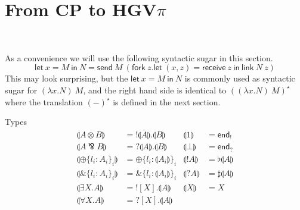 \documentclass{easychair}
\newcommand{\key}{\mathsf}
\newcommand{\set}[1]{\{ #1 \}}
\newcommand{\cptogv}[1]{\llparenthesis{#1}\rrparenthesis}
\newcommand{\row}[2]{\set{#1}_{#2}}
\newcommand{\gvOutput}[2]{\mathord{!}{#1}.{#2}}
\newcommand{\gvInput}[2]{\mathord{?}{#1}.{#2}}
\newcommand{\gvEndOutput}{\key{end}_!}
\newcommand{\gvEndInput}{\key{end}_?}
\newcommand{\gvPlus}[2]{\oplus \row{#1}{#2}}
\newcommand{\gvChoice}[2]{\binampersand \row{#1}{#2}}
\newcommand{\gvServer}[1]{\flat {#1}}
\newcommand{\gvService}[1]{\sharp {#1}}
\newcommand{\gvDual}[1]{\overline{#1}}
\newcommand{\gvOutputType}[2]{![{#1}].{#2}}
\newcommand{\gvInputType}[2]{?[{#1}].{#2}}
\newcommand{\la}{l}
\newcommand{\gvLink}[2]{\key{link}~{#1}~{#2}}
\newcommand{\gvLam}[2]{\lambda {#1}.{#2}}
\newcommand{\gvApp}[2]{{#1}~{#2}}
\newcommand{\gvPair}[2]{({#1},{#2})}
\newcommand{\gvLet}[3]{\key{let}~{#1}={#2}~\key{in}~{#3}}
\newcommand{\gvSend}[2]{\key{send}~{#1}~{#2}}
\newcommand{\gvReceive}[1]{\key{receive}~{#1}}
\newcommand{\gvFork}[2]{\key{fork}~{#1}.{#2}}
\newcommand{\gvWith}[3]{\key{with}~{#1}~\key{connect}~{#2}~\key{to}~{#3}}
\newcommand{\gvReceiveK}[4]{\gvLet{\gvPair{#1}{#2}}{\gvReceive{#3}}{#4}}
\newcommand{\gvServeOld}[3]{\key{serve}~{#1}({#2})={#3}}
\newcommand{\cpTimes}[2]{{#1} \otimes {#2}}
\newcommand{\cpPar}[2]{{#1} \mathbin{\bindnasrepma} {#2}}
\newcommand{\cpPlus}[2]{\oplus \row{#1}{#2}}
\newcommand{\cpWith}[2]{\binampersand \row{#1}{#2}}
\newcommand{\cpOne}{1}
\newcommand{\cpBottom}{\bot}
\newcommand{\cpOfCourse}[1]{!{#1}}
\newcommand{\cpWhyNot}[1]{?{#1}}
\newcommand{\cpExists}[2]{\exists {#1}.{#2}}
\newcommand{\cpForall}[2]{\forall {#1}.{#2}}
\newcommand{\hgvpi}{HGV$\pi$\xspace}
\newcommand{\lampi}[1]{({#1})^\star}
\begin{document}

\section{From CP to \hgvpi}
~

As a convenience we will use the following syntactic sugar in this
section.
\[
\gvLet{x}{M}{N} = \gvSend{M}{(\gvFork{z}{\gvReceiveK{x}{z}{z}{\gvLink{N}{z}}})}
\]
This may look surprising, but the $\gvLet{x}{M}{N}$ is commonly used
as syntactic sugar for $\gvApp{(\gvLam{x}{N})}{M}$, and the right hand
side is identical to $\lampi{\gvApp{(\gvLam{x}{N})}{M}}$ where the
translation $\lampi{-}$ is defined in the next section.

Types
\begin{align*}
\cptogv{\cpTimes{A}{B}} &= \gvOutput{\gvDual{\cptogv{A}}}{\cptogv{B}} & \cptogv{\cpOne} &= \gvEndOutput \\
\cptogv{\cpPar{A}{B}} &= \gvInput{\cptogv{A}}{\cptogv{B}} & \cptogv{\cpBottom} &= \gvEndInput \\
\cptogv{\cpPlus{\la_i:A_i}{i}} &= \gvPlus{\la_i:\cptogv{A_i}}{i} & \cptogv{\cpOfCourse{A}} &= \gvServer{\cptogv{A}} \\
\cptogv{\cpWith{\la_i:A_i}{i}} &= \gvChoice{\la_i:\cptogv{A_i}}{i} & \cptogv{\cpWhyNot{A}} &= \gvService{\cptogv{A}} \\
\cptogv{\cpExists{X}{A}} &= \gvOutputType{X}{\cptogv{A}} & \cptogv{X} &= X \\
\cptogv{\cpForall{X}{A}} &= \gvInputType{X}{\cptogv{A}} \\
\end{align*}
\end{document}
